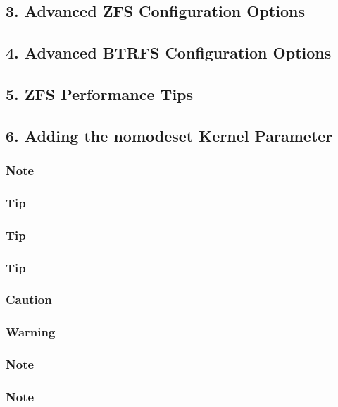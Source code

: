 \subsection{3. Advanced ZFS Configuration Options}

\subsection{4. Advanced BTRFS Configuration Options}

\subsection{5. ZFS Performance Tips}

\subsection{6. Adding the nomodeset Kernel Parameter}

\subsubsection{Note}

\subsubsection{Tip}

\subsubsection{Tip}

\subsubsection{Tip}

\subsubsection{Caution}

\subsubsection{Warning}

\subsubsection{Note}

\subsubsection{Note}

